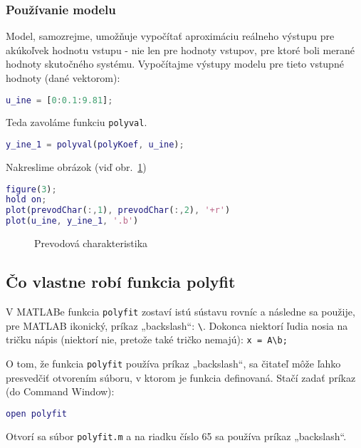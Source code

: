 \documentclass[a4paper, 10pt, ]{article}
\begin{document}
\subsubsection{Používanie modelu}

Model, samozrejme, umožňuje vypočítať aproximáciu reálneho výstupu pre akúkoľvek hodnotu vstupu - nie len pre hodnoty vstupov, pre ktoré boli merané hodnoty skutočného systému. Vypočítajme výstupy modelu pre tieto vstupné hodnoty (dané vektorom):
\begin{lstlisting}[language=Matlab, numbers=none]
u_ine = [0:0.1:9.81];
\end{lstlisting}
Teda zavoláme funkciu \verb|polyval|.
\begin{lstlisting}[language=Matlab, numbers=none]
y_ine_1 = polyval(polyKoef, u_ine);
\end{lstlisting}
Nakreslime obrázok (viď obr.~\ref{Prevodová charakteristika nuine})
\begin{lstlisting}[language=Matlab, numbers=none]
figure(3);
hold on;
plot(prevodChar(:,1), prevodChar(:,2), '+r')
plot(u_ine, y_ine_1, '.b')
\end{lstlisting}


\begin{figure}[t]
	\centering


    \vspace{-4mm}

	\caption{Prevodová charakteristika}
	\label{Prevodová charakteristika nuine}

\end{figure}





\subsection{Čo vlastne robí funkcia polyfit}

V MATLABe funkcia \verb|polyfit| zostaví istú sústavu rovníc a následne sa použije, pre MATLAB ikonický, príkaz „backslash“: \verb|\|. Dokonca niektorí ľudia nosia na tričku nápis (niektorí nie, pretože také tričko nemajú): \verb|x = A\b;|


O tom, že funkcia \verb|polyfit| používa príkaz „backslash“, sa čitateľ môže ľahko presvedčiť otvorením súboru, v ktorom je funkcia definovaná. Stačí zadať príkaz (do Command Window):
\begin{lstlisting}[language=Matlab, numbers=none]
open polyfit
\end{lstlisting}
Otvorí sa súbor \verb|polyfit.m| a na riadku číslo 65 sa používa príkaz „backslash“.
\end{document}
